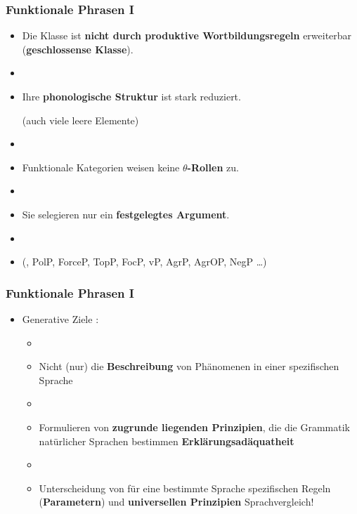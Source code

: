 \begin{frame}
\frametitle{Funktionale Phrasen I}

\begin{itemize}
	
	\item Die Klasse ist \textbf{nicht durch produktive Wortbildungsregeln} erweiterbar (\textbf{geschlossense Klasse}).
	
	\item[]
	
	\item Ihre \textbf{phonologische Struktur} ist stark reduziert. 
	
	(\ras auch viele leere Elemente)
	
	\item[]
	
	\item Funktionale Kategorien weisen keine \textbf{$\theta$-Rollen} zu.
	
	\item[]
	
	\item Sie selegieren nur ein \textbf{festgelegtes Argument}.
	
	\item[]
	
	\item {} (, PolP, ForceP, TopP, FocP, vP, AgrP, AgrOP, NegP \dots )
	
\end{itemize}

\end{frame}


\begin{frame}
\frametitle{Funktionale Phrasen I}

\begin{itemize}
	\item Generative Ziele \citep[vgl.][]{Haegeman94a}:
	\begin{itemize}
		\item[]
		\item Nicht (nur) die \textbf{Beschreibung} von Phänomenen in einer spezifischen Sprache
		\item[]
		\item Formulieren von \textbf{zugrunde liegenden Prinzipien}, die die Grammatik natürlicher Sprachen bestimmen \ras \textbf{Erklärungsadäquatheit}
		\item[]
		\item Unterscheidung von für eine bestimmte Sprache spezifischen Regeln (\textbf{Parametern}) und \textbf{universellen Prinzipien} \ras Sprachvergleich!
	\end{itemize}
	
\end{itemize}

\end{frame}



